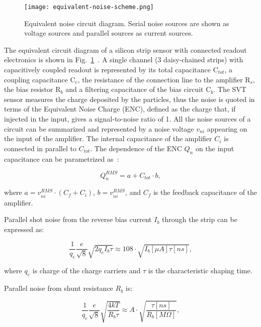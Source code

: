 \begin{figure}[hbt] 
\centering 
\texttt{[image: equivalent-noise-scheme.png]}
\caption{Equivalent noise circuit diagram. Serial noise sources are shown as voltage sources and
parallel sources as current sources.}
\label{fig:equivalent-noise-scheme}
\end{figure}

The equivalent circuit diagram of a silicon strip sensor with connected readout electronics is shown in Fig.~\ref{fig:equivalent-noise-scheme}~\cite{SPIELER}. A single channel (3 daisy-chained strips) with capacitively coupled readout is represented by its total capacitance C$_{tot}$, a coupling capacitance C$_c$, the resistance of the connection line to the amplifier R$_s$, the bias resistor R$_b$ and a filtering capacitance of the bias circuit C$_b$. The SVT sensor measures the charge deposited by the particles, thus the noise is quoted in terms of the Equivalent Noise Charge (ENC), defined as the charge that, if injected in the input, gives a signal-to-noise ratio of 1. All the noise sources of a circuit can be summarized and represented by a noise voltage $v_{ni}$ appearing on the input of the amplifier. The internal capacitance of the amplifier $C_i$ is connected in parallel to $C_{tot}$. The dependence of the ENC $Q_n$ on the input capacitance can be parametrized as~\cite{BLOCHTHESIS}:

\begin{equation} Q^{RMS}_{n}=a+C_{tot}{\cdot}b  \label{eq:qn},
\end{equation}

where $a = v^{RMS}_{ni} \cdot (C_{f} + C_{i})$, $b = v^{RMS}_{ni}$, and $C_f$ is the feedback capacitance of the amplifier.

Parallel shot noise from the reverse bias current $I_b$ through the strip can be expressed as:

\begin{equation} \frac{1}{q_e}\frac{e}{\sqrt{8}}\sqrt{2q_eI_b\tau} \approx 108\cdot\sqrt{I_b[\mu A]\tau [ns]}  \label{eq:bias},
\end{equation}

where $q_e$ is charge of the charge carriers and $\tau$ is the characteristic shaping time.

Parallel noise from shunt resistance $R_b$ is:

\begin{equation} \frac{1}{q_e}\frac{e}{\sqrt{8}}\sqrt{\frac{4kT}{R_b\tau}} \approx A\cdot\sqrt{\frac{\tau [ns]}{R_b[M \Omega]}} \label{eq:shunt},
\end{equation}

